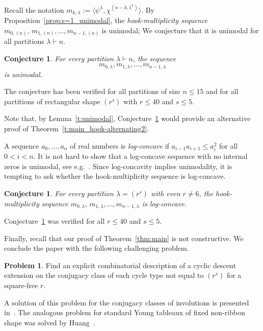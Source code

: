 \documentclass[10pt]{article}
\newtheorem{conjecture}[theorem]{Conjecture}
\theoremstyle{definition}
\newtheorem{problem}[cdrthm]{Problem}
\begin{document}
Recall the notation $m_{k,\lambda}:= \langle 
\psi^{\lambda},\chi^{(n-k,1^k)} \rangle$. 
By Proposition~\ref{prop:s=1_unimodal}, the \emph{hook-multiplicity sequence} $m_{0,(n)},\,m_{1,(n)},\ldots, m_{n-1,(n)}$ is unimodal; 
We conjecture that it is unimodal for all partitions $\lambda\vdash n$.  

\begin{conjecture}\label{conj:unimodal}
    For every partition $\lambda \vdash n$, the sequence
    \[
        m_{0,\lambda},m_{1,\lambda},\ldots,m_{n-1,\lambda}
    \]
    is unimodal.
\end{conjecture}
    
The conjecture has been verified for all partitions of size $n \le 15$ and for all partitions of rectangular shape $(r^s)$ with $r \le 40$ and $s \le 5$.   
    
Note that, by Lemma~\ref{t:unimodal}, Conjecture~\ref{conj:unimodal} would provide an alternative proof of Theorem~\ref{t:main_hook-alternating2}. 
  
A sequence $a_0,\ldots,a_n$ of real numbers is 
\emph{log-concave} if  $a_{i-1}a_{i+1}\le a_i^2$ for all  $0<i<n$. 
It is not hard to show that a log-concave sequence with no internal zeros is unimodal, see e.g.~\cite{Brenti, Stanley}.
Since log-concavity implies unimodality, it is tempting to ask whether the hook-multiplicity sequence is log-concave.

\begin{conjecture}\label{conj:r1}
For every partition $\lambda=(r^s)$ with even $r\ne 6$,
the hook-multiplicity sequence $m_{0,\lambda},\,m_{1,\lambda},\ldots, m_{n-1,\lambda}$ is log-concave.
\end{conjecture}

Conjecture~\ref{conj:r1} 
was verified for all $r\leq 40$ and $s\leq 5$. 

Finally, recall that our proof of Theorem~\ref{thm:main} is not constructive. 
We conclude the paper with the following challenging 
problem.

\begin{problem} 
    Find 
    an explicit combinatorial description of a cyclic descent extension on the conjugacy class of each cycle type not equal to $(r^s)$ for a square-free $r$.
\end{problem}

A solution of this problem for the conjugacy classes of involutions 
is presented in~\cite{Adin-R23}. The analogous problem for standard Young tableaux of fixed non-ribbon shape was solved by Huang~\cite{Huang}. 
\end{document}
